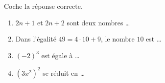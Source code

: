 \begin{exercise}[points=2]
    Coche la réponse correcte.

    \begin{enumerate}
        \item $2n+1$ et $2n+2$ sont deux nombres \dots
        \item Dans l'égalité $49=4\cdot10+9$, le nombre $10$ est \dots
        \item $(-2)^3$ est égale à \dots
        \item $\left(3x^2\right)^2$ se réduit en \dots
    \end{enumerate}
\end{exercise}

\pagebreak
\begin{solution}

\end{solution}
